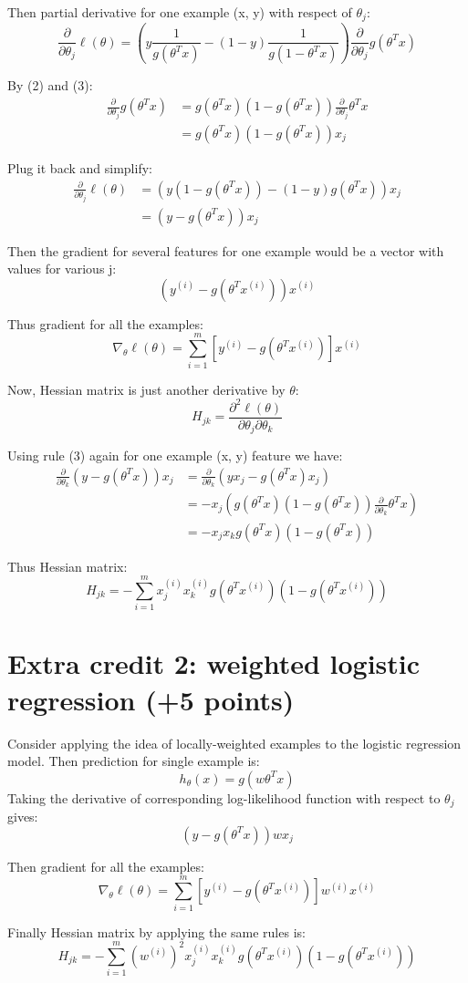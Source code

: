 \documentclass{article}
\newcommand{\patheta}{\frac{\partial}{\partial \theta_j} }
\newcommand{\thetax}{\theta^T x}
\newcommand{\elll}{\ell(\theta)}
\newcommand{\pelll}{\frac{\partial^2 \elll}{\partial \theta_j \partial \theta_k}}
\newcommand{\ith}{^{(i)}}
\begin{document}
	Then partial derivative for one example (x, y) with respect of $\theta_j$:
	$$
	\patheta \elll = (y \frac{1}{g(\theta^T x)} - (1-y)\frac{1}{g(1-\theta^T x)}) \patheta g(\thetax) $$
	
	By (2) and (3): 
	\begin{align*} \patheta g(\thetax) &= g(\thetax)(1 - g(\thetax)) \patheta \thetax\\
	&= g(\thetax)(1 - g(\thetax)) x_j 
	\end{align*}
	
	Plug it back and simplify:
	\begin{align*}
	\patheta \elll &= (y(1-g(\thetax)) - (1-y)g(\thetax))x_j\\
	&= (y-g(\thetax))x_j 
	\end{align*}
	
	Then the gradient for several features for one example would be a vector with values for various j:
	$$(y^{(i)}-g(\thetax^{(i)}))x^{(i)} $$
	
	Thus gradient for all the examples:
	$$\nabla_\theta \elll = \sum_{i=1}^{m}[y^{(i)} - g(\thetax^{(i)})] x^{(i)} $$
	
	Now, Hessian matrix is just another derivative by $\theta$:
	$$H_{jk} = \pelll $$

	Using rule (3) again for one example (x, y) feature we have:
	\begin{align*}
	\frac{\partial}{\partial \theta_k}  (y-g(\thetax))x_j &=\frac{\partial}{\partial \theta_k} (yx_j - g(\thetax)x_j)\\
	&= -x_j (g(\thetax)(1 - g(\thetax)) \frac{\partial}{\partial \theta_k} \thetax)\\
	&= -x_j x_k g(\thetax)(1 - g(\thetax))
	\end{align*}
	
	Thus Hessian matrix:
	$$H_{jk} = - \sum_{i=1}^{m} x_j^{(i)} x_k^{(i)} g(\thetax^{(i)})(1 - g(\thetax \ith))$$
	
\section{Extra credit 2: weighted logistic regression (+5 points)}
	Consider applying the idea of locally-weighted examples to the logistic regression model. Then prediction for single example is:
	$$ h_\theta(x) = g(w\thetax) $$
	Taking the derivative of corresponding log-likelihood function with respect to $\theta_j$ gives:
	$$(y-g(\thetax)) w x_j $$
	
	Then gradient for all the examples:
	$$\nabla_\theta \elll = \sum_{i=1}^{m}[y^{(i)} - g(\thetax^{(i)})] w^{(i)} x^{(i)} $$
	
	Finally Hessian matrix by applying the same rules is:
	$$H_{jk} = - \sum_{i=1}^{m} (w^{(i)})^2 x_j^{(i)} x_k^{(i)} g(\thetax^{(i)})(1 - g(\thetax \ith))$$
	
	
     
\end{document}
